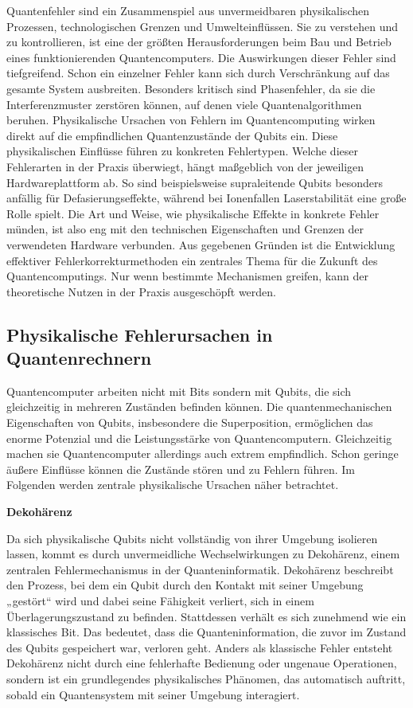 Quantenfehler sind ein Zusammenspiel aus unvermeidbaren physikalischen Prozessen, technologischen Grenzen und Umwelteinflüssen. Sie zu verstehen und zu kontrollieren, ist eine der größten Herausforderungen beim Bau und Betrieb eines funktionierenden Quantencomputers. Die Auswirkungen dieser Fehler sind tiefgreifend. Schon ein einzelner Fehler kann sich durch Verschränkung auf das gesamte System ausbreiten. Besonders kritisch sind Phasenfehler, da sie die Interferenzmuster zerstören können, auf denen viele Quantenalgorithmen beruhen.
Physikalische Ursachen von Fehlern im Quantencomputing wirken direkt auf die empfindlichen Quantenzustände der Qubits ein. Diese physikalischen Einflüsse führen zu konkreten Fehlertypen. Welche dieser Fehlerarten in der Praxis überwiegt, hängt maßgeblich von der jeweiligen Hardwareplattform ab. So sind beispielsweise supraleitende Qubits besonders anfällig für Defasierungseffekte, während bei Ionenfallen Laserstabilität eine große Rolle spielt. Die Art und Weise, wie physikalische Effekte in konkrete Fehler münden, ist also eng mit den technischen Eigenschaften und Grenzen der verwendeten Hardware verbunden.
Aus gegebenen Gründen ist die Entwicklung effektiver Fehlerkorrekturmethoden ein zentrales Thema für die Zukunft des Quantencomputings. Nur wenn bestimmte Mechanismen greifen, kann der theoretische Nutzen in der Praxis ausgeschöpft werden.


\subsection{Physikalische Fehlerursachen in Quantenrechnern}
Quantencomputer arbeiten nicht mit Bits sondern mit Qubits, die sich gleichzeitig in mehreren Zuständen befinden können. Die quantenmechanischen Eigenschaften von Qubits, insbesondere die Superposition, ermöglichen das enorme Potenzial und die Leistungsstärke von Quantencomputern. Gleichzeitig machen sie Quantencomputer allerdings auch extrem empfindlich. Schon geringe äußere Einflüsse können die Zustände stören und zu Fehlern führen. Im Folgenden werden zentrale physikalische Ursachen näher betrachtet.\medskip


\textbf{Dekohärenz}

Da sich physikalische Qubits nicht vollständig von ihrer Umgebung isolieren lassen, kommt es durch unvermeidliche Wechselwirkungen zu Dekohärenz, einem zentralen Fehlermechanismus in der Quanteninformatik.
Dekohärenz beschreibt den Prozess, bei dem ein Qubit durch den Kontakt mit seiner Umgebung „gestört“ wird und dabei seine Fähigkeit verliert, sich in einem Überlagerungszustand zu befinden. Stattdessen verhält es sich zunehmend wie ein klassisches Bit. Das bedeutet, dass die Quanteninformation, die zuvor im Zustand des Qubits gespeichert war, verloren geht. Anders als klassische Fehler entsteht Dekohärenz nicht durch eine fehlerhafte Bedienung oder ungenaue Operationen, sondern ist ein grundlegendes physikalisches Phänomen, das automatisch auftritt, sobald ein Quantensystem mit seiner Umgebung interagiert.

